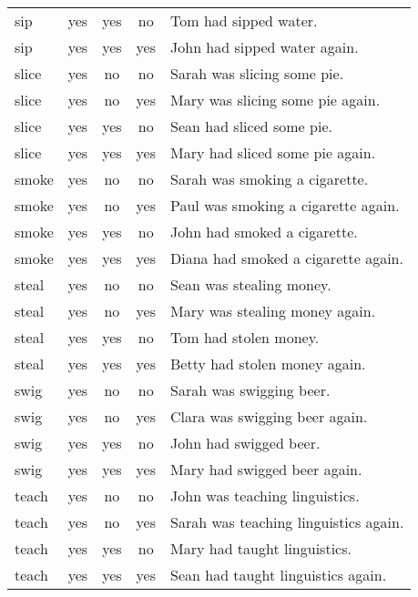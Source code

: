\begin{longtable}{l|ccc|p{5cm}}
sip       & yes  & yes  & no   & Tom had sipped water.                        \\
sip       & yes  & yes  & yes  & John had sipped water again.                 \\
slice     & yes  & no   & no   & Sarah was slicing some pie.                  \\
slice     & yes  & no   & yes  & Mary was slicing some pie again.             \\
slice     & yes  & yes  & no   & Sean had sliced some pie.                    \\
slice     & yes  & yes  & yes  & Mary had sliced some pie again.              \\
smoke     & yes  & no   & no   & Sarah was smoking a cigarette.               \\
smoke     & yes  & no   & yes  & Paul was smoking a cigarette again.          \\
smoke     & yes  & yes  & no   & John had smoked a cigarette.                 \\
smoke     & yes  & yes  & yes  & Diana had smoked a cigarette again.          \\
steal     & yes  & no   & no   & Sean was stealing money.                     \\
steal     & yes  & no   & yes  & Mary was stealing money again.               \\
steal     & yes  & yes  & no   & Tom had stolen money.                        \\
steal     & yes  & yes  & yes  & Betty had stolen money again.                \\
swig      & yes  & no   & no   & Sarah was swigging beer.                     \\
swig      & yes  & no   & yes  & Clara was swigging beer again.               \\
swig      & yes  & yes  & no   & John had swigged beer.                       \\
swig      & yes  & yes  & yes  & Mary had swigged beer again.                 \\
teach     & yes  & no   & no   & John was teaching linguistics.               \\
teach     & yes  & no   & yes  & Sarah was teaching linguistics again.        \\
teach     & yes  & yes  & no   & Mary had taught linguistics.                 \\
teach     & yes  & yes  & yes  & Sean had taught linguistics again.           \\

\end{longtable}
